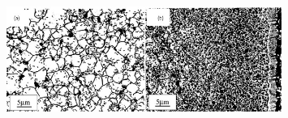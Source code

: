 \begin{frame}
  \vspace{-1.5em}
  \begin{columns}[T]
    \begin{column}{0.5\textwidth}
      \begin{figure}
        \centering
        \includegraphics[width=0.8\textwidth]{Chapter345/figures/HBS}
      \end{figure}
      

\end{column}
\end{columns}
\end{frame}
